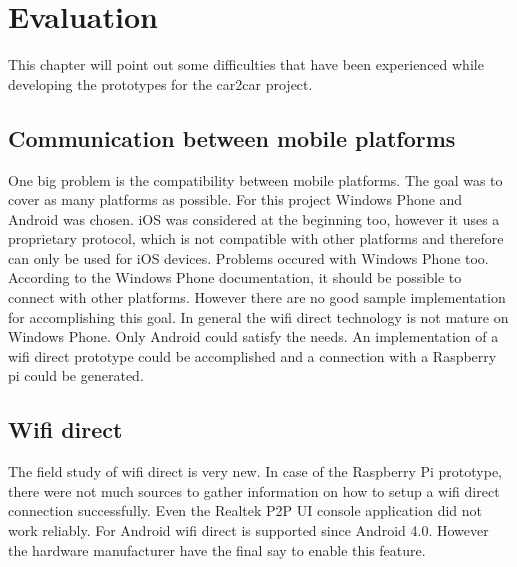 \chapter{Evaluation}
\label{cha:Evaluation}
This chapter will point out some difficulties that have been experienced while developing the prototypes for the car2car project.

\section{Communication between mobile platforms}
\label{sec:CommunicationBetweenPlattforms}
One big problem is the compatibility between mobile platforms. The goal was to cover as many platforms as possible. For this project Windows Phone and Android was chosen. iOS was considered at the beginning too, however it uses a proprietary protocol, which is not compatible with other platforms and therefore can only be used for iOS devices. Problems occured with Windows Phone too. According to the Windows Phone documentation, it should be possible to connect with other platforms. However there are no good sample implementation for accomplishing this goal. In general the wifi direct technology is not mature on Windows Phone. Only Android could satisfy the needs. An implementation of a wifi direct prototype could be accomplished and a connection with a Raspberry pi could be generated.

\section{Wifi direct}
\label{sec:WifiDirect}
The field study of wifi direct is very new. In case of the Raspberry Pi prototype, there were not much sources to gather information on how to setup a wifi direct connection successfully. Even the Realtek P2P UI console application did not work reliably. For Android wifi direct is supported since Android 4.0. However the hardware manufacturer have the final say to enable this feature. 


